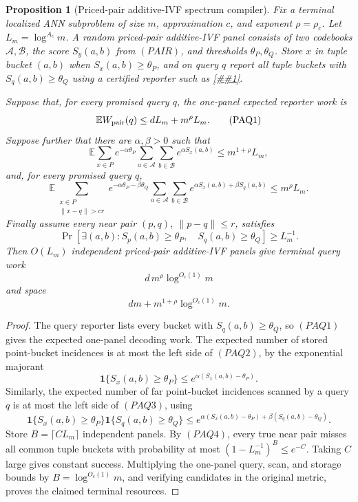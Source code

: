 \documentclass[10pt]{article}
\newcommand{\cref}[1]{\ref{##1}}
\newtheorem{proposition}[theorem]{Proposition}
\theoremstyle{definition}
\newcommand{\E}{\mathbb{E}}
\begin{document}
\begin{proposition}[Priced-pair additive-IVF spectrum compiler]
   \label{prop:priced-pair-additive-ivf-compiler}
   Fix a terminal localized ANN subproblem of size \(m\), approximation \(c\),
   and exponent \(\rho=\rho_c\).  Let \(L_m=\log^{A_c}m\).  A random
   priced-pair additive-IVF panel consists of two codebooks
   \(\mathcal A,\mathcal B\), the score \(S_y(a,b)\) from \((PAIR)\), and
   thresholds \(\theta_P,\theta_Q\).  Store \(x\) in tuple bucket \((a,b)\)
   when \(S_x(a,b)\ge\theta_P\), and on query \(q\) report all tuple buckets
   with \(S_q(a,b)\ge\theta_Q\) using a certified reporter such as
   \cref{lem:priced-pair-additive-ivf-reporter}.

   Suppose that, for every promised query \(q\), the one-panel expected
   reporter work is
   \[
      \E W_{\rm pair}(q)\le dL_m+m^\rho L_m .
      \tag{PAQ1}
   \]
   Suppose further that there are \(\alpha,\beta>0\) such that
   \[
      \E
      \sum_{x\in P}
      e^{-\alpha\theta_P}
      \sum_{a\in\mathcal A}\sum_{b\in\mathcal B}
      e^{\alpha S_x(a,b)}
      \le
      m^{1+\rho}L_m,
      \tag{PAQ2}
   \]
   and, for every promised query \(q\),
   \[
      \E
      \sum_{\substack{x\in P\\ \|x-q\|>cr}}
      e^{-\alpha\theta_P-\beta\theta_Q}
      \sum_{a\in\mathcal A}\sum_{b\in\mathcal B}
      e^{\alpha S_x(a,b)+\beta S_q(a,b)}
      \le
      m^\rho L_m .
      \tag{PAQ3}
   \]
   Finally assume every near pair \((p,q)\), \(\|p-q\|\le r\), satisfies
   \[
      \Pr\!\left[
      \exists(a,b):
      S_p(a,b)\ge\theta_P,\quad S_q(a,b)\ge\theta_Q
      \right]
      \ge L_m^{-1}.
      \tag{PAQ4}
   \]
   Then \(O(L_m)\) independent priced-pair additive-IVF panels give terminal
   query work
   \[
      d\,m^\rho\log^{O_c(1)}m
   \]
   and space
   \[
      dm+m^{1+\rho}\log^{O_c(1)}m .
   \]
\end{proposition}

\begin{proof}
   The query reporter lists every bucket with \(S_q(a,b)\ge\theta_Q\), so
   \((PAQ1)\) gives the expected one-panel decoding work.  The expected number
   of stored point-bucket incidences is at most the left side of \((PAQ2)\),
   by the exponential majorant
   \[
      \mathbf 1\{S_x(a,b)\ge\theta_P\}
      \le e^{\alpha(S_x(a,b)-\theta_P)} .
   \]
   Similarly, the expected number of far point-bucket incidences scanned by a
   query \(q\) is at most the left side of \((PAQ3)\), using
   \[
      \mathbf 1\{S_x(a,b)\ge\theta_P\}
      \mathbf 1\{S_q(a,b)\ge\theta_Q\}
      \le
      e^{\alpha(S_x(a,b)-\theta_P)+\beta(S_q(a,b)-\theta_Q)} .
   \]
   Store \(B=\lceil C L_m\rceil\) independent panels.  By \((PAQ4)\), every
   true near pair misses all common tuple buckets with probability at most
   \((1-L_m^{-1})^B\le e^{-C}\).  Taking \(C\) large gives constant success.
   Multiplying the one-panel query, scan, and storage bounds by
   \(B=\log^{O_c(1)}m\), and verifying candidates in the original metric,
   proves the claimed terminal resources.
\end{proof}
\end{document}
